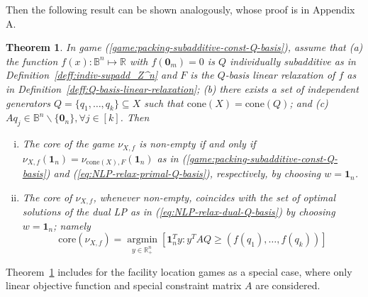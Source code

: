 \documentclass[11pt]{article}\usepackage[]{graphicx}\usepackage[]{xcolor}
\newtheorem{thm}{Theorem}
\DeclareMathOperator*{\argmin}{argmin}
\begin{document}
Then the following result can be shown analogously, whose proof is in Appendix A. 
\begin{thm}\label{thm:nonlinear-packing-const-X-generators}
In game (\ref{game:packing-subadditive-const-Q-basis}), assume that (a) the function $f(x): \mathbb{B}^n\mapsto\mathbb{R}$ with $f(\mathbf{0}_m)=0$ is $Q$ individually subadditive as in Definition~\ref{deff:indiv-supadd_Z^n} and $F$ is the $Q$-basis linear relaxation of $f$ as in Definition~\ref{deff:Q-basis-linear-relaxation}; (b) there exists a set of independent generators $Q=\{q_1,\dots, q_k\}\subseteq X$ such that $\text{cone}(X)=\text{cone}(Q)$; and (c)  $Aq_j\in \mathbb{B}^n\backslash \{\mathbf{0}_n\}, \forall j\in [k]$. Then 
\begin{enumerate}[(i)]
\item The core of the game $\nu_{X, f}$ is non-empty if and only if $\nu_{X, f}\left(\mathbf{1}_n\right)=\nu_{\text{cone}(X), F}\left(\mathbf{1}_n\right)$ as in (\ref{game:packing-subadditive-const-Q-basis}) and (\ref{eq:NLP-relax-primal-Q-basis}), respectively, by choosing $w=\mathbf{1}_n$.
\item The core of $\nu_{X, f}$, whenever non-empty, coincides with the set of optimal solutions of the dual LP as in (\ref{eq:NLP-relax-dual-Q-basis}) by choosing $w=\mathbf{1}_n$; namely
 \[
 \text{core} \left(\nu_{X, f}\right)=\argmin\limits_{y\in \mathbb{R}^n_{+}} \left[\mathbf{1}_n^Ty: y^TAQ\ge \left(f(q_1),\dots, f(q_k)\right)\right]
 \]
\end{enumerate}
\end{thm}



Theorem~\ref{thm:nonlinear-packing-const-X-generators} includes \citep[Theorem 2.1]{goemans2004cooperative} for the facility location games as a special case, where only linear objective function and special constraint matrix $A$ are considered.  
\end{document}
